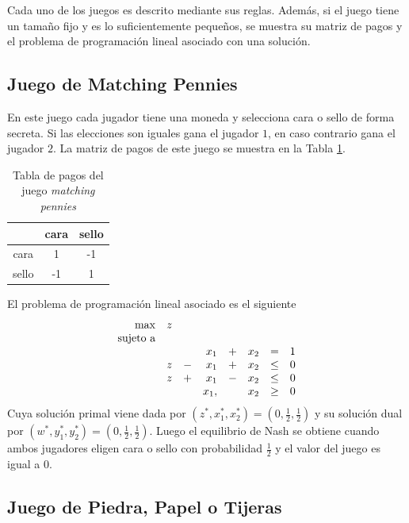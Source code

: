 Cada uno de los juegos es descrito mediante sus reglas. Además, si el juego tiene un tamaño fijo y es lo suficientemente pequeños, se muestra su matriz de pagos y el problema de programación lineal asociado con una solución.

\subsection*{Juego de Matching Pennies}

En este juego cada jugador tiene una moneda y selecciona cara o sello de forma secreta. Si las elecciones son iguales gana el jugador $1$, en caso contrario gana el jugador $2$. La matriz de pagos de este juego se muestra en la Tabla \ref{table:pagos-matching-pennies}.

\begin{table}[ht]
\begin{center}
\caption[Tabla de pagos del juego matching pennies]{Tabla de pagos del juego \textit{matching pennies}}
\label{table:pagos-matching-pennies}
\begin{tabular}{ c | c | c |}
 & cara & sello  \\ \hline
 cara  &  1 & -1 \\ \hline
 sello & -1 &  1 \\ \hline
\end{tabular}
\end{center}
\end{table}

El problema de programación lineal asociado es el siguiente
\begin{equation}
\begin{array}{r r r r r r r r}
\max  & z &  & & & & &\\
\text{sujeto a} \\  
&   &   & x_1  & + & x_2 & = & 1 \\
& z & - & x_1  & + & x_2 & \leq & 0 \\
& z & + & x_1  & - & x_2 & \leq & 0 \\
&   &   & x_1, &   & x_2 & \geq & 0
\end{array}
\end{equation}
Cuya solución primal viene dada por $(z^*, x_1^*, x_2^*) = (0, \frac{1}{2}, \frac{1}{2})$ y su solución dual por $(w^*, y^*_1, y^*_2) = (0, \frac{1}{2}, \frac{1}{2})$. Luego el equilibrio de Nash se obtiene cuando ambos jugadores eligen cara o sello con probabilidad $\frac{1}{2}$ y el valor del juego es igual a $0$.

\subsection*{Juego de Piedra, Papel o Tijeras}

